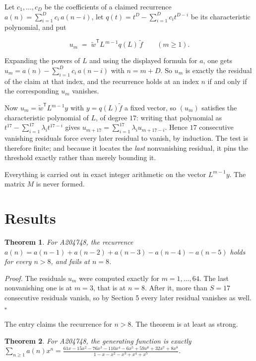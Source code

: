 \documentclass[11pt]{article}
\newtheorem{theorem}{Theorem}
\theoremstyle{definition}
\begin{document}
Let $c_1,\dots,c_D$ be the coefficients of a claimed recurrence $a(n) = \sum_{i=1}^{D} c_i\,a(n-i)$, let $q(t) = t^{D} - \sum_{i=1}^{D} c_i t^{D-i}$ be its characteristic polynomial, and put

\[u_m \;=\; \tilde w^{\mathsf T} L^{\,m-1} q(L)\,\tilde f \qquad (m \ge 1).\]

Expanding the powers of $L$ and using the displayed formula for $a$, one gets $u_m = a(n) - \sum_{i=1}^{D} c_i\,a(n-i)$ with $n = m + D$. So $u_m$ is exactly the residual of the claim at that index, and the recurrence holds at an index $n$ if and only if the corresponding $u_m$ vanishes.

Now $u_m = \tilde w^{\mathsf T} L^{m-1} y$ with $y = q(L)\tilde f$ a fixed vector, so $(u_m)$ satisfies the characteristic polynomial of $L$, of degree $17$: writing that polynomial as $t^{17} - \sum_{i=1}^{17} \lambda_i t^{17-i}$ gives $u_{m+17} = \sum_{i=1}^{17} \lambda_i u_{m+17-i}$. Hence $17$ consecutive vanishing residuals force every later residual to vanish, by induction. The test is therefore finite; and because it locates the {\itshape last} nonvanishing residual, it pins the threshold exactly rather than merely bounding it.

Everything is carried out in exact integer arithmetic on the vector $L^{m-1}y$. The matrix $M$ is never formed.

\section{Results}

\begin{theorem} For A204748, the recurrence $a(n) = a(n-1) + a(n-2) + a(n-3) - a(n-4) - a(n-5)$ holds for every $n > 8$, and fails at $n = 8$.\end{theorem}

{\itshape Proof.} The residuals $u_m$ were computed exactly for $m = 1,\dots,64$. The last nonvanishing one is at $m = 3$, that is at $n = 8$. After it, more than $S = 17$ consecutive residuals vanish, so by Section 5 every later residual vanishes as well. $\square$

The entry claims the recurrence for $n > 8$. The theorem is at least as strong.

\begin{theorem} For A204748, the generating function is exactly $\sum_{n\ge 1} a(n)x^n = \frac{61x - 15x^{2} - 76x^{3} - 110x^{4} - 6x^{5} + 59x^{6} + 32x^{7} + 8x^{8}}{1 - x - x^{2} - x^{3} + x^{4} + x^{5}}$.\end{theorem}
\end{document}
